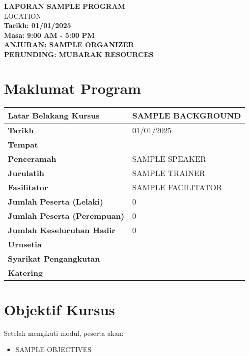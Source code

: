 \documentclass[a4paper,12pt]{article}
\begin{document}
\begin{center}
    \vspace*{1cm}
    \textbf{\huge LAPORAN SAMPLE PROGRAM}\\
    \vspace{0.5cm}
    \textbfSAMPLE LOCATION\\
    \vspace{0.5cm}
    \textbf{Tarikh: 01/01/2025}\\
    \vspace{0.5cm}
    \textbf{Masa: 9:00 AM - 5:00 PM}\\
    \vspace{1cm}
    \textbf{ANJURAN: SAMPLE ORGANIZER}\\
    \vspace{0.5cm}
    \textbf{PERUNDING: MUBARAK RESOURCES}
\end{center}

\tableofcontents
\newpage

\section{Maklumat Program}
\begin{tabular}{|l|l|}
    \hline
    \textbf{Latar Belakang Kursus} & SAMPLE BACKGROUND \\
    \hline
    \textbf{Tarikh} & 01/01/2025 \\
    \hline
    \textbf{Tempat} &  \\
    \hline
    \textbf{Penceramah} & SAMPLE SPEAKER \\
    \hline
    \textbf{Jurulatih} & SAMPLE TRAINER \\
    \hline
    \textbf{Fasilitator} & SAMPLE FACILITATOR \\
    \hline
    \textbf{Jumlah Peserta (Lelaki)} & 0 \\
    \hline
    \textbf{Jumlah Peserta (Perempuan)} & 0 \\
    \hline
    \textbf{Jumlah Keseluruhan Hadir} & 0 \\
    \hline
    \textbf{Urusetia} &  \\
    \hline
    \textbf{Syarikat Pengangkutan} &  \\
    \hline
    \textbf{Katering} &  \\
    \hline
\end{tabular}

\section{Objektif Kursus}
Setelah mengikuti modul, peserta akan:
\begin{itemize}
    \item SAMPLE OBJECTIVES
\end{itemize}
\end{document}
